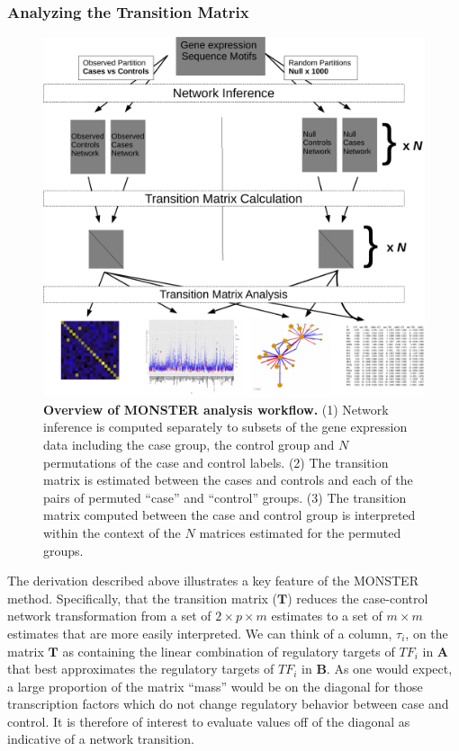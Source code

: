 \subsubsection*{Analyzing the Transition Matrix}

\begin{figure}
\centering{}\includegraphics[width=1\columnwidth]{figures/SupportingFigure1}\caption{\textbf{Overview of MONSTER analysis workflow.} (1) Network inference is computed separately to subsets of the gene expression data including the case group, the control group and $N$ permutations of the case and control labels. (2) The transition matrix is estimated between the cases and controls and each of the pairs of permuted ``case'' and ``control'' groups. (3) The transition matrix computed between the case and control group is interpreted within the context of the $N$ matrices estimated for the permuted groups.}
\label{fig:Supplement_workflow}
\end{figure}

The derivation described above illustrates a key feature of the MONSTER method. Specifically, that the transition matrix ($\mathbf{T}$) reduces the case-control network transformation from a set of $2\times p\times m$ estimates to a set of $m\times m$ estimates that are more easily interpreted. We can think of a column, $\tau_{i}$, on the matrix $\mathbf{T}$ as containing the linear combination of regulatory targets of $TF_{i}$ in $\mathbf{A}$ that best approximates the regulatory targets of $TF_{i}$ in $\mathbf{B}$. As one would expect, a large proportion of the matrix ``mass'' would be on the diagonal for those transcription factors which do not change regulatory behavior between case and control. It is therefore of interest to evaluate values off of the diagonal as indicative of a network transition.

